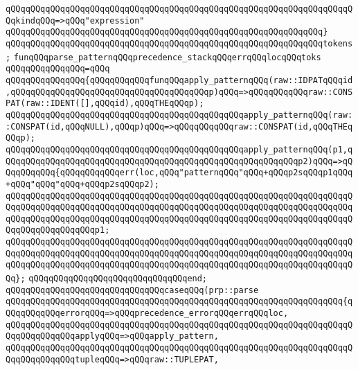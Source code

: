 \verb|qQQqqQQqqQQqqQQqqQQqqQQqqQQqqQQqqQQqqQQqqQQqqQQqqQQqqQQqqQQqqQQqqQQqqQQqkindqQQq=>qQQq"expression"|\newline
\verb|qQQqqQQqqQQqqQQqqQQqqQQqqQQqqQQqqQQqqQQqqQQqqQQqqQQqqQQqqQQqqQQq}|\newline
\verb|qQQqqQQqqQQqqQQqqQQqqQQqqQQqqQQqqQQqqQQqqQQqqQQqqQQqqQQqqQQqqQQqtokens;|\newline
\newline
\verb|funqQQqparse_patternqQQqprecedence_stackqQQqerrqQQqlocqQQqtoks|\newline
\verb|qQQqqQQqqQQqqQQq=qQQq|\newline
\verb|qQQqqQQqqQQqqQQq{qQQqqQQqqQQqfunqQQqapply_patternqQQq(raw::IDPATqQQqid,qQQqqQQqqQQqqQQqqQQqqQQqqQQqqQQqqQQqqQQqp)qQQq=>qQQqqQQqqQQqraw::CONSPAT(raw::IDENT([],qQQqid),qQQqTHEqQQqp);|\newline
\verb|qQQqqQQqqQQqqQQqqQQqqQQqqQQqqQQqqQQqqQQqqQQqqQQqapply_patternqQQq(raw::CONSPAT(id,qQQqNULL),qQQqp)qQQq=>qQQqqQQqqQQqraw::CONSPAT(id,qQQqTHEqQQqp);|\newline
\verb|qQQqqQQqqQQqqQQqqQQqqQQqqQQqqQQqqQQqqQQqqQQqqQQqapply_patternqQQq(p1,qQQqqQQqqQQqqQQqqQQqqQQqqQQqqQQqqQQqqQQqqQQqqQQqqQQqqQQqqQQqp2)qQQq=>qQQqqQQqqQQq{qQQqqQQqqQQqerr(loc,qQQq"patternqQQq"qQQq+qQQqp2sqQQqp1qQQq+qQQq"qQQq"qQQq+qQQqp2sqQQqp2);|\newline
\verb|qQQqqQQqqQQqqQQqqQQqqQQqqQQqqQQqqQQqqQQqqQQqqQQqqQQqqQQqqQQqqQQqqQQqqQQqqQQqqQQqqQQqqQQqqQQqqQQqqQQqqQQqqQQqqQQqqQQqqQQqqQQqqQQqqQQqqQQqqQQqqQQqqQQqqQQqqQQqqQQqqQQqqQQqqQQqqQQqqQQqqQQqqQQqqQQqqQQqqQQqqQQqqQQqqQQqqQQqqQQqqQQqqQQqp1;|\newline
\verb|qQQqqQQqqQQqqQQqqQQqqQQqqQQqqQQqqQQqqQQqqQQqqQQqqQQqqQQqqQQqqQQqqQQqqQQqqQQqqQQqqQQqqQQqqQQqqQQqqQQqqQQqqQQqqQQqqQQqqQQqqQQqqQQqqQQqqQQqqQQqqQQqqQQqqQQqqQQqqQQqqQQqqQQqqQQqqQQqqQQqqQQqqQQqqQQqqQQqqQQqqQQqqQQqqQQq};|\newline
\verb|qQQqqQQqqQQqqQQqqQQqqQQqqQQqqQQqend;|\newline
\newline
\verb|qQQqqQQqqQQqqQQqqQQqqQQqqQQqqQQqcaseqQQq(prp::parse|\newline
\verb|qQQqqQQqqQQqqQQqqQQqqQQqqQQqqQQqqQQqqQQqqQQqqQQqqQQqqQQqqQQqqQQqqQQq{qQQqqQQqqQQqerrorqQQq=>qQQqprecedence_errorqQQqerrqQQqloc,|\newline
\verb|qQQqqQQqqQQqqQQqqQQqqQQqqQQqqQQqqQQqqQQqqQQqqQQqqQQqqQQqqQQqqQQqqQQqqQQqqQQqqQQqqQQqapplyqQQq=>qQQqapply_pattern,|\newline
\verb|qQQqqQQqqQQqqQQqqQQqqQQqqQQqqQQqqQQqqQQqqQQqqQQqqQQqqQQqqQQqqQQqqQQqqQQqqQQqqQQqqQQqtupleqQQq=>qQQqraw::TUPLEPAT,|\newline
